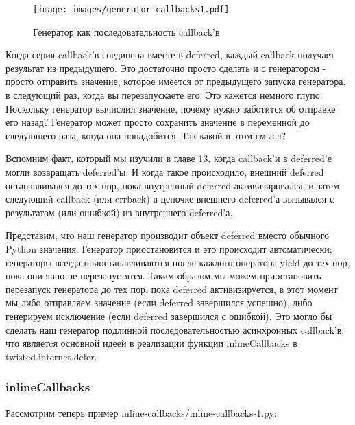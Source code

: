 \begin{figure}[h]
\begin{center}
    \texttt{[image: images/generator-callbacks1.pdf]}
    \caption{Генератор как последовательность callback'в\label{fig:generator-callbacks1}}
\end{center}
\end{figure}


Когда серия callback'в соединена вместе в deferred, 
каждый callback получает результат из предыдущего. Это достаточно 
просто сделать и с генератором - просто отправить значение, которое 
имеется от предыдущего запуска генератора, в следующий раз, когда 
вы перезапускаете его. Это кажется немного глупо. Поскольку генератор 
вычислил значение, почему нужно заботится об отправке его назад? 
Генератор может просто сохранить значение в переменной до 
следующего раза, когда она понадобится. Так какой в этом смысл?


Вспомним факт, который мы изучили в главе 13, когда 
callback'и в deferred'е могли возвращать deferred'ы. 
И когда такое происходило, внешний deferred останавливался до тех 
пор, пока внутренный deferred активизировался, и затем 
следующий callback (или errback) в цепочке внешнего deferred'а 
вызывался с результатом (или ошибкой) из внутреннего deferred'а.


Представим, что наш генератор производит объект deferred вместо 
обычного Python значения. Генератор приостановится и это происходит 
автоматически; генераторы всегда приостанавливаются после каждого 
оператора yield до тех пор, пока они явно не перезапустятся. 
Таким образом мы можем приостановить перезапуск генератора до тех пор, 
пока deferred активизируется, в этот момент мы либо отправляем значение 
(если deferred завершился успешно), либо генерируем исключение (если 
deferred завершился с ошибкой). Это могло бы сделать наш генератор 
подлинной последовательностью асинхронных callback'в, что  
являетcя основной идеей в реализации функции inlineCallbacks в twisted.internet.defer. 


\subsubsection{inlineCallbacks}

Рассмотрим теперь пример inline-callbacks/inline-callbacks-1.py:


